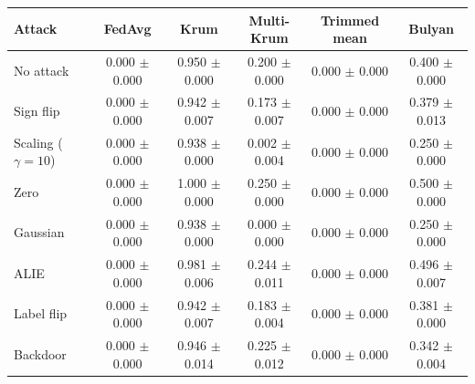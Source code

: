 \begin{tabular}{lccccc}
\toprule
Attack & FedAvg & Krum & Multi-Krum & Trimmed mean & Bulyan \\
\midrule
No attack & 0.000 $\pm$ 0.000 & 0.950 $\pm$ 0.000 & 0.200 $\pm$ 0.000 & 0.000 $\pm$ 0.000 & 0.400 $\pm$ 0.000 \\
Sign flip & 0.000 $\pm$ 0.000 & 0.942 $\pm$ 0.007 & 0.173 $\pm$ 0.007 & 0.000 $\pm$ 0.000 & 0.379 $\pm$ 0.013 \\
Scaling ($\gamma=10$) & 0.000 $\pm$ 0.000 & 0.938 $\pm$ 0.000 & 0.002 $\pm$ 0.004 & 0.000 $\pm$ 0.000 & 0.250 $\pm$ 0.000 \\
Zero & 0.000 $\pm$ 0.000 & 1.000 $\pm$ 0.000 & 0.250 $\pm$ 0.000 & 0.000 $\pm$ 0.000 & 0.500 $\pm$ 0.000 \\
Gaussian & 0.000 $\pm$ 0.000 & 0.938 $\pm$ 0.000 & 0.000 $\pm$ 0.000 & 0.000 $\pm$ 0.000 & 0.250 $\pm$ 0.000 \\
ALIE & 0.000 $\pm$ 0.000 & 0.981 $\pm$ 0.006 & 0.244 $\pm$ 0.011 & 0.000 $\pm$ 0.000 & 0.496 $\pm$ 0.007 \\
Label flip & 0.000 $\pm$ 0.000 & 0.942 $\pm$ 0.007 & 0.183 $\pm$ 0.004 & 0.000 $\pm$ 0.000 & 0.381 $\pm$ 0.000 \\
Backdoor & 0.000 $\pm$ 0.000 & 0.946 $\pm$ 0.014 & 0.225 $\pm$ 0.012 & 0.000 $\pm$ 0.000 & 0.342 $\pm$ 0.004 \\
\bottomrule
\end{tabular}
